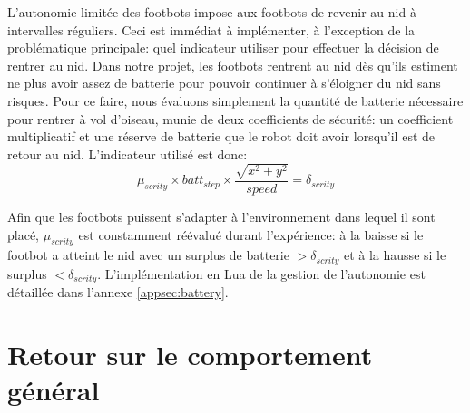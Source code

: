 L'autonomie limitée des footbots impose aux footbots de revenir au nid à intervalles réguliers. Ceci est immédiat à implémenter, à l'exception de la problématique principale: quel indicateur utiliser pour effectuer la décision de rentrer au nid. Dans notre projet, les footbots rentrent au nid dès qu'ils estiment ne plus avoir assez de batterie pour pouvoir continuer à s'éloigner du nid sans risques. Pour ce faire, nous évaluons simplement la quantité de batterie nécessaire pour rentrer à vol d'oiseau, munie de deux coefficients de sécurité: un coefficient multiplicatif et une réserve de batterie que le robot doit avoir lorsqu'il est de retour au nid. L'indicateur utilisé est donc:
\[
  \mu_{scrity} \times batt_{step} \times \frac{\sqrt{x^2+y^2}}{speed}=\delta_{scrity}
\]

Afin que les footbots puissent s'adapter à l'environnement dans lequel il sont placé, $\mu_{scrity}$ est constamment réévalué durant l'expérience: à la baisse si le footbot a atteint le nid avec un surplus de batterie $>\delta_{scrity}$ et à la hausse si le surplus $<\delta_{scrity}$.
L'implémentation en Lua de la gestion de l'autonomie est détaillée dans l'annexe \ref{appsec:battery}.



\section{Retour sur le comportement général\label{sec:tree}}

